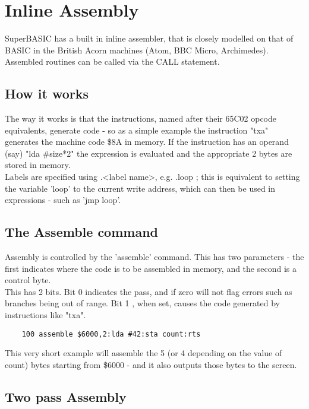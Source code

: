 \chapter{Inline Assembly}

SuperBASIC has a built in inline assembler, that is closely modelled on that of BASIC in the British Acorn machines (Atom, BBC Micro, Archimedes). Assembled routines can be called via the CALL statement.\\

\section{How it works}

The way it works is that the instructions, named after their 65C02 opcode equivalents, generate code - so as a simple example the instruction "txa" generates the machine code \$8A in memory. If the instruction has an operand (say) "lda \#size*2" the expression is evaluated and the appropriate 2 bytes are stored in memory. \\

Labels are specified using .<label name>, e.g. .loop ; this is equivalent to setting the variable 'loop' to the current write address, which can then be used in expressions - such as 'jmp loop'.

\section {The Assemble command}

Assembly is controlled by the 'assemble' command. This has two parameters - the first indicates where the code is to be assembled in memory, and the second is a control byte. \\

This has 2 bits.  Bit 0 indicates the pass, and if zero will not flag errors such as branches being out of range. Bit 1 , when set, causes the code generated by instructions like "txa".

\begin{verbatim}
	100 assemble $6000,2:lda #42:sta count:rts
\end{verbatim}

This very short example will assemble the 5 (or 4 depending on the value of count) bytes starting from \$6000 - and it also outputs those bytes to the screen. \\

\section {Two pass Assembly}

